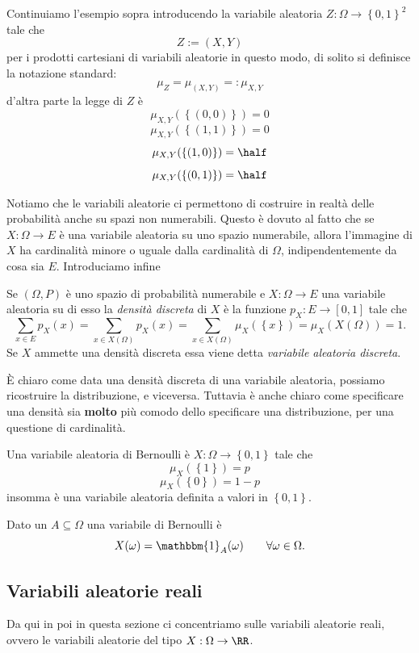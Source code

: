 \documentclass[11pt]{scrartcl}
\begin{document}
	\begin{example}
		Continuiamo l'esempio sopra introducendo la variabile aleatoria $Z:\Omega\to \left\{0,1\right\}^2$ tale che
		$$Z:=\left(X,Y\right)$$
		per i prodotti cartesiani di variabili aleatorie in questo modo, di solito si definisce la notazione standard:
		$$\mu_Z=\mu_{(X,Y)}=:\mu_{X,Y}$$
		d'altra parte la legge di $Z$ è
		$$\mu_{X,Y}(\left\{(0,0)\right\})=0$$
		$$\mu_{X,Y}(\left\{(1,1)\right\})=0$$
		$$\mu_{X,Y}(\left\{(1,0)\right\})=\half$$
		$$\mu_{X,Y}(\left\{(0,1)\right\})=\half$$
	\end{example}
	Notiamo che le variabili aleatorie ci permettono di costruire in realtà delle probabilità anche su spazi non numerabili. Questo è dovuto al fatto che se $X:\Omega\to E$ è una variabile aleatoria su uno spazio numerabile, allora l'immagine di $X$ ha cardinalità minore o uguale dalla cardinalità di $\Omega$, indipendentemente da cosa sia $E$. Introduciamo infine
	\begin{definition}
		Se $(\Omega,P)$ è uno spazio di probabilità numerabile e $X:\Omega\to E$ una variabile aleatoria su di esso la \textit{densità discreta} di $X$ è la funzione  $p_X:E\to[0,1]$
		tale che 
		$$\sum_{x\in E} p_X(x)=\sum_{x\in X(\Omega)}p_X(x)=\sum_{x\in X(\Omega)}\mu_X(\left\{x\right\})=\mu_X(X(\Omega))=1.$$ 
		Se $X$ ammette una densità discreta essa viene detta \textit{variabile aleatoria discreta}.
	\end{definition}
	\`E chiaro come data una densità discreta di una variabile aleatoria, possiamo ricostruire la distribuzione, e viceversa. Tuttavia è anche chiaro come specificare una densità sia \textbf{molto} più comodo dello specificare una distribuzione, per una questione di cardinalità.
	\begin{definition}
		Una variabile aleatoria di Bernoulli è $X:\Omega\to \left\{0,1\right\}$ tale che
		$$\mu_X(\left\{1\right\})=p$$
		$$\mu_X(\left\{0\right\})=1-p$$
		insomma è una variabile aleatoria definita a valori in $\left\{0,1\right\}$.
	\end{definition}
	\begin{example}
		Dato un $A\subseteq \Omega$ una variabile di Bernoulli è
		$$X(\omega)=\mathbbm{1}_A(\omega) \qquad \forall \omega\in \Omega.$$
	\end{example}
	\subsection{Variabili aleatorie reali}
	Da qui in poi in questa sezione ci concentriamo sulle variabili aleatorie reali, ovvero le variabili aleatorie del tipo $X:\Omega\to \RR$.
\end{document}
